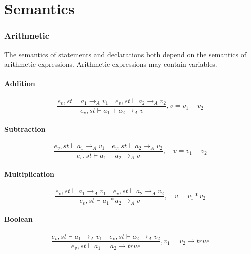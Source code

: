 \chapter{Semantics}\label{app:semantics}
\subsection*{Arithmetic}
The semantics of statements and declarations both depend on the semantics of arithmetic expressions.
Arithmetic expressions may contain variables.

\subsubsection{Addition}
\begin{equation}
	\frac { { e }_{ v },st\vdash { a }_{ 1 }{ \rightarrow  }_{ A }{ v }_{ 1 }\quad { e }_{ v },st\vdash { a }_{ 2 }{ \rightarrow  }_{ A }{ v }_{ 2 } }{ { e }_{ v },st\vdash { a }_{ 1 }+{ a }_{ 2 }{ \rightarrow  }_{ A }{ v } } , v = { v }_{ 1 }+{ v }_{ 2 }
\end{equation}


\subsubsection{Subtraction}
\begin{equation}
	\frac { { e }_{ v },st\vdash { a }_{ 1 }{ \rightarrow  }_{ A }{ v }_{ 1 }\quad { e }_{ v },st\vdash { a }_{ 2 }{ \rightarrow  }_{ A }{ v }_{ 2 } }{ { e }_{ v },st\vdash { a }_{ 1 }-{ a }_{ 2 }{ \rightarrow  }_{ A }{ v } } ,\quad v={ v }_{ 1 }-{ v }_{ 2 }
\end{equation}


\subsubsection{Multiplication}
\begin{equation}
	\frac { { e }_{ v },st\vdash { a }_{ 1 }{ \rightarrow  }_{ A }{ v }_{ 1 }\quad { e }_{ v },st\vdash { a }_{ 2 }{ \rightarrow  }_{ A }{ v }_{ 2 } }{ { e }_{ v },st\vdash { a }_{ 1 }\ast { a }_{ 2 }{ \rightarrow  }_{ A }{ v } } ,\quad v={ v }_{ 1 }\ast { v }_{ 2 }
\end{equation}


\subsubsection{Boolean $\top$}
\begin{equation}
	\frac { { e }_{ v },st\vdash { a }_{ 1 }{ \rightarrow  }_{ A }{ v }_{ 1 }\quad { e }_{ v },st\vdash { a }_{ 2 }{ \rightarrow  }_{ A }{ v }_{ 2 } }{ { e }_{ v },st\vdash { a }_{ 1 }={ a }_{ 2 }{ \rightarrow  }true } ,{ v }_{ 1 }={ v }_{ 2 }\rightarrow true
\end{equation}


